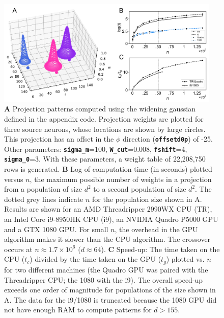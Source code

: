 \documentclass[12pt, a4paper]{article}
\newcommand{\code}[1]{\textbf{\texttt{#1}}}
\begin{document}
\begin{figure}[h!]
\includegraphics[width=0.95\textwidth]{./fig1.png}
\caption{\textbf{A} Projection patterns computed using the widening gaussian
defined in the appendix code. Projection weights are plotted for three source
neurons, whose locations are shown by large circles. This projection has an
offset in the $\phi$ direction (\code{offsetd0p}) of -25. Other parameters:
\code{sigma\_m}=100, \code{W\_cut}=0.008, \code{fshift}=4, \code{sigma\_0}=3. With
these parameters, a weight table of 22,208,750 rows is generated.
%
\textbf{B}
Log of computation time (in seconds) plotted versus $n$, the maximum possible
number of weights in a projection from a population of size $d^2$ to a second
population of size $d^2$. The dotted grey lines indicate $n$ for the
population size shown in A. Results are shown for an AMD Threadripper 2990WX
CPU (TR), an Intel Core i9-8950HK CPU (i9), an NVIDIA Quadro P5000 GPU and a
GTX 1080 GPU. For small $n$, the overhead in the GPU algorithm makes it slower
than the CPU algorithm. The crossover occurs at $n\approx1.7\times10^6$
($d\approx64$).
%
\textbf{C} Speed-up: The time taken on the CPU ($t_c$) divided by the
time taken on the GPU ($t_g$) plotted vs. $n$ for two different machines (the
Quadro GPU was paired with the Threadripper CPU; the 1080 with the i9). The
overall speed-up exceeds one order of magnitude for populations of the size
shown in A. The data for the i9/1080 is truncated because the 1080 GPU did not
have enough RAM to compute patterns for $d>155$.}
\vspace{-10pt}
\label{f1}
\end{figure}
\end{document}
